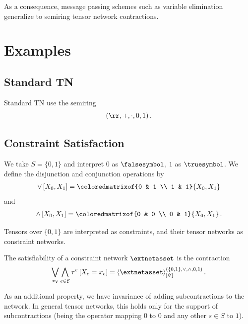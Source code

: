 \documentclass[aps,onecolumn,nofootinbib,pra]{article}
\newcommand{\booleansemiring}{(\{0,1\},\lor,\land,0,1)}
\newcommand{\srcontractionofwrt}[3]{\langle#1\rangle^{#3}_{[#2]}}
\begin{document}
    As a consequence, message passing schemes such as variable elimination generalize to semiring tensor network contractions.


    \section{Examples}

    \subsection{Standard TN}

    Standard TN use the semiring
    \begin{align*}
        (\rr,+,\cdot,0,1) \, .
    \end{align*}

    \subsection{Constraint Satisfaction}

    We take $S=\{0,1\}$ and interpret $0$ as $\falsesymbol$, $1$ as $\truesymbol$.
    We define the disjunction and conjunction operations by
    \begin{align*}
        \lor \left[\catvariableof{0},\catvariableof{1}\right]
        = \coloredmatrixof{0 & 1 \\ 1 & 1}{\catvariableof{0},\catvariableof{1}}
    \end{align*}
    and
    \begin{align*}
        \land \left[\catvariableof{0},\catvariableof{1}\right]
        = \coloredmatrixof{0 & 0 \\ 0 & 1}{\catvariableof{0},\catvariableof{1}} \, .
    \end{align*}

    Tensors over $\{0,1\}$ are interpreted as constraints, and their tensor networks as constraint networks.

    The satisfiability of a constraint network $\extnetasset$ is the contraction
    \begin{align*}
        \bigvee_{\catindexof{\nodes}} \bigwedge_{\edgein} \hypercoreofat{\edge}{\indexedcatvariableof{\edge}}
        = \srcontractionofwrt{
            \extnetasset
        }{\varnothing}{\booleansemiring} \, .
    \end{align*}

    As an additional property, we have invariance of adding subcontractions to the network.
    In general tensor networks, this holds only for the support of subcontractions (being the operator mapping $0$ to $0$ and any other $s\in S$ to $1$).
\end{document}
